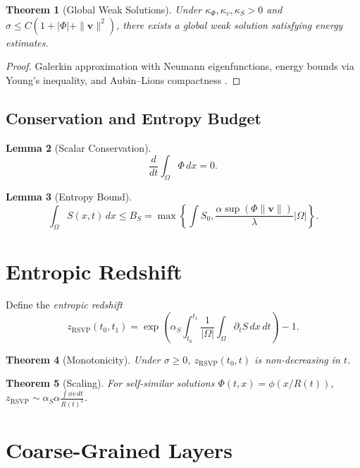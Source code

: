 \documentclass[11pt,twoside]{article}
\newtheorem{theorem}{Theorem}[section]
\newtheorem{lemma}[theorem]{Lemma}
\theoremstyle{definition}
\theoremstyle{remark}
\begin{document}
\begin{theorem}[Global Weak Solutions]
\label{thm:weak}
Under $\kappa_\Phi,\kappa_v,\kappa_S > 0$ and $\sigma \le C(1 + |\Phi| + \|\mathbf{v}\|^2)$, there exists a global weak solution satisfying energy estimates.
\end{theorem}

\begin{proof}
Galerkin approximation with Neumann eigenfunctions, energy bounds via Young’s inequality, and Aubin--Lions compactness \cite{Lions1969}.
\end{proof}

\subsection{Conservation and Entropy Budget}

\begin{lemma}[Scalar Conservation]
\[
\frac{d}{dt} \int_\Omega \Phi\,dx = 0.
\]
\end{lemma}

\begin{lemma}[Entropy Bound]
\[
\int_\Omega S(x,t)\,dx \le B_S = \max\left\{ \int S_0, \frac{\alpha \sup(\Phi \|\mathbf{v}\|)}{\lambda} |\Omega| \right\}.
\]
\end{lemma}

\section{Entropic Redshift}
\label{sec:redshift}

Define the \emph{entropic redshift}
\begin{equation}
\boxed{z_{\mathrm{RSVP}}(t_0,t_1) = \exp\left( \alpha_S \int_{t_0}^{t_1} \frac{1}{|\Omega|} \int_\Omega \partial_t S\,dx\,dt \right) - 1.}
\label{eq:z}
\end{equation}

\begin{theorem}[Monotonicity]
Under $\sigma \ge 0$, $z_{\mathrm{RSVP}}(t_0,t)$ is non-decreasing in $t$.
\end{theorem}

\begin{theorem}[Scaling]
For self-similar solutions $\Phi(t,x) = \phi(x/R(t))$, $z_{\mathrm{RSVP}} \sim \alpha_S \alpha \frac{\int \phi v\,dt}{R(t)^2}$.
\end{theorem}

\section{Coarse-Grained Layers}
\label{sec:layers}
\end{document}
